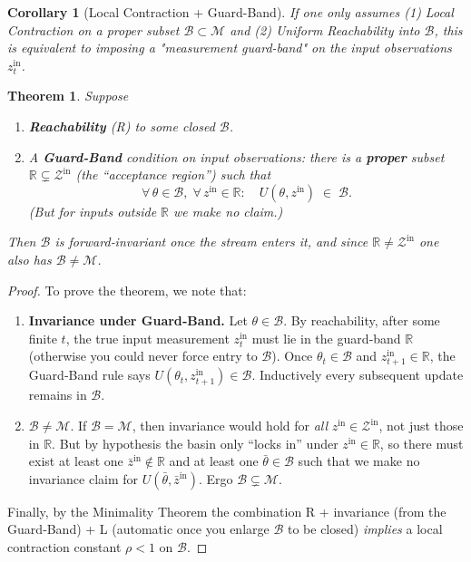 \documentclass[12pt]{article}
\theoremstyle{definition}
\theoremstyle{plain}
\newtheorem{theorem}{Theorem}[section]
\newtheorem{corollary}{Corollary}[section]
\begin{document}
\begin{corollary}[Local Contraction + Guard-Band]
If one only assumes (1) Local Contraction on a proper subset $\mathcal{B} \subset \mathcal{M}$ and (2) Uniform Reachability into $\mathcal{B}$, this is equivalent to imposing a "measurement guard-band" on the input observations $z^{\text{in}}_t$.
\end{corollary}
\begin{theorem} 
Suppose
\begin{enumerate}
    \item \textbf{Reachability} (R) to some closed $\mathcal{B}$.
    \item A \textbf{Guard‑Band} condition on input observations: there is a \textbf{proper} subset $\mathbb{R}\subsetneq\mathcal{Z}^{\text{in}}$ (the “acceptance region”) such that
\[
     \forall\,\theta\in\mathcal{B},\;\forall\,z^{\text{in}}\in\mathbb{R}: \quad U(\theta,z^{\text{in}})\;\in\;\mathcal{B}.
\]
(But for inputs outside $\mathbb{R}$ we make no claim.)     
\end{enumerate}
Then $\mathcal{B}$ is forward‑invariant once the stream enters it, and since $\mathbb{R}\neq\mathcal{Z}^{\text{in}}$ one also has $\mathcal{B}\neq\mathcal{M}$.
\end{theorem}
\begin{proof}
To prove the theorem, we note that:
\begin{enumerate}
    \item \textbf{Invariance under Guard‑Band.} Let $\theta\in\mathcal{B}$. By reachability, after some finite $t$, the true input measurement $z^{\text{in}}_t$ must lie in the guard‑band $\mathbb{R}$ (otherwise you could never force entry to $\mathcal{B}$). Once $\theta_t\in\mathcal{B}$ and $z^{\text{in}}_{t+1}\in\mathbb{R}$, the Guard‑Band rule says $U(\theta_t,z^{\text{in}}_{t+1})\in\mathcal{B}$. Inductively every subsequent update remains in $\mathcal{B}$.
    \item $\mathcal{B} \neq \mathcal{M}$. If $\mathcal{B}=\mathcal{M}$, then invariance would hold for \textit{all} $z^{\text{in}}\in\mathcal{Z}^{\text{in}}$, not just those in $\mathbb{R}$. But by hypothesis the basin only “locks in” under $z^{\text{in}}\in\mathbb{R}$, so there must exist at least one $\bar{z}^{\text{in}}\notin\mathbb{R}$ and at least one $\bar\theta\in\mathcal{B}$ such that we make no invariance claim for $U(\bar\theta,\bar{z}^{\text{in}})$. Ergo $\mathcal{B}\subsetneq\mathcal{M}$.
\end{enumerate}
Finally, by the Minimality Theorem the combination R + invariance (from the Guard‑Band) + L (automatic once you enlarge $\mathcal{B}$ to be closed) \textit{implies} a local contraction constant $\rho<1$ on $\mathcal{B}$.
\end{proof}
\end{document}
